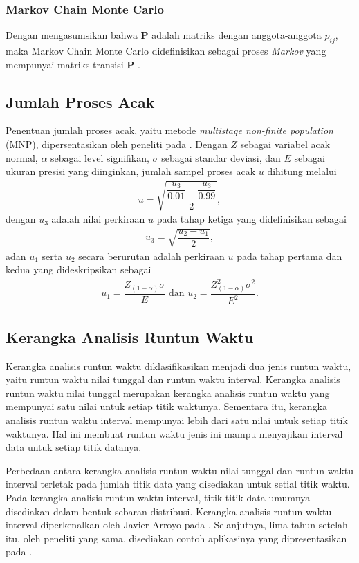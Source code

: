 {{{{{{\subsubsection{Markov Chain Monte Carlo}
Dengan mengasumsikan bahwa $\mathbf{P}$ adalah matriks dengan anggota-anggota $p_{ij}$, maka Markov Chain Monte Carlo didefinisikan sebagai proses \textit{Markov} yang mempunyai matriks transisi $\mathbf{P}$ \cite{Revuz1984}.

\subsection{Jumlah Proses Acak}
Penentuan jumlah proses acak, yaitu metode \textit{multistage non-finite population} (MNP), dipersentasikan oleh peneliti pada \cite{Louangrath2014}. Dengan $Z$ sebagai variabel acak normal, $\alpha$ sebagai level signifikan, $\sigma$ sebagai standar deviasi, dan $E$ sebagai ukuran presisi yang diinginkan, jumlah sampel proses acak $u$ dihitung melalui
\begin{align}\label{mnp1}
u=\sqrt{\dfrac{\dfrac{u_3}{0.01}-\dfrac{u_3}{0.99}}{2}},
\end{align}
dengan $u_3$ adalah nilai perkiraan $u$ pada tahap ketiga yang didefinisikan sebagai
\begin{align}\label{mnp2}
u_3=\sqrt{\dfrac{u_2-u_1}{2}},
\end{align}
adan $u_1$ serta $u_2$ secara berurutan adalah perkiraan $u$ pada tahap pertama dan kedua yang dideskripsikan sebagai  
\begin{align}\label{mnp3}
	u_1=\dfrac{Z_{(1-\alpha)}\sigma}{E}\text{ dan }u_2=\dfrac{Z_{(1-\alpha)}^2\sigma^2}{E^2}.
\end{align}

\subsection{Kerangka Analisis Runtun Waktu}
Kerangka analisis runtun waktu diklasifikasikan menjadi dua jenis runtun waktu, yaitu runtun waktu nilai tunggal dan runtun waktu interval. Kerangka analisis runtun waktu nilai tunggal merupakan kerangka analisis runtun waktu yang mempunyai satu nilai untuk setiap titik waktunya. Sementara itu, kerangka analisis runtun waktu interval mempunyai lebih dari satu nilai untuk setiap titik waktunya. Hal ini membuat runtun waktu jenis ini mampu menyajikan interval data untuk setiap titik datanya. 

Perbedaan antara kerangka analisis runtun waktu nilai tunggal dan runtun waktu interval terletak pada jumlah titik data yang disediakan untuk setial titik waktu. Pada kerangka analisis runtun waktu interval, titik-titik data umumnya disediakan dalam bentuk sebaran distribusi. Kerangka analisis runtun waktu interval diperkenalkan oleh Javier Arroyo pada \cite{Arroyo2006}. Selanjutnya, lima tahun setelah itu, oleh peneliti yang sama, disediakan contoh aplikasinya yang dipresentasikan pada \cite{Arroyo2011}.

}}}}}}
